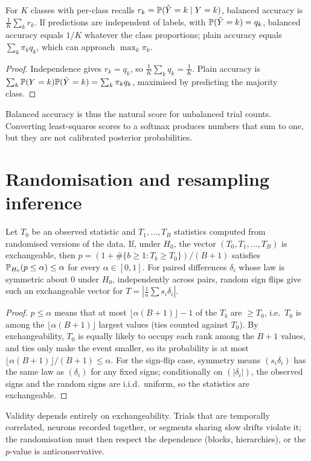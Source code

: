 \begin{theorem}\label{ars:dec-001}
For $K$ classes with per-class recalls $r_k=\mathbb P(\hat Y=k\mid Y=k)$, balanced accuracy is $\frac1K\sum_kr_k$. If predictions are independent of labels, with $\mathbb P(\hat Y=k)=q_k$, balanced accuracy equals $1/K$ whatever the class proportions; plain accuracy equals $\sum_k\pi_kq_k$, which can approach $\max_k\pi_k$.
\end{theorem}
\begin{proof}
Independence gives $r_k=q_k$, so $\frac1K\sum_kq_k=\frac1K$. Plain accuracy is $\sum_k\mathbb P(Y=k)\mathbb P(\hat Y=k)=\sum_k\pi_kq_k$, maximised by predicting the majority class.
\end{proof}
Balanced accuracy is thus the natural score for unbalanced trial counts. Converting least-squares scores to a softmax produces numbers that sum to one, but they are not calibrated posterior probabilities.

\section{Randomisation and resampling inference}
\begin{theorem}\label{ars:perm-001}
Let $T_0$ be an observed statistic and $T_1,\dots,T_B$ statistics computed from randomised versions of the data. If, under $H_0$, the vector $(T_0,T_1,\dots,T_B)$ is exchangeable, then $p=(1+\#\{b\ge1:T_b\ge T_0\})/(B+1)$ satisfies $\mathbb P_{H_0}(p\le\alpha)\le\alpha$ for every $\alpha\in[0,1]$. For paired differences $\delta_i$ whose law is symmetric about $0$ under $H_0$, independently across pairs, random sign flips give such an exchangeable vector for $T=|\frac1n\sum s_i\delta_i|$.
\end{theorem}
\begin{proof}
$p\le\alpha$ means that at most $\lfloor\alpha(B+1)\rfloor-1$ of the $T_b$ are $\ge T_0$, i.e.\ $T_0$ is among the $\lfloor\alpha(B+1)\rfloor$ largest values (ties counted against $T_0$). By exchangeability, $T_0$ is equally likely to occupy each rank among the $B+1$ values, and ties only make the event smaller, so its probability is at most $\lfloor\alpha(B+1)\rfloor/(B+1)\le\alpha$. For the sign-flip case, symmetry means $(s_i\delta_i)$ has the same law as $(\delta_i)$ for any fixed signs; conditionally on $(|\delta_i|)$, the observed signs and the random signs are i.i.d.\ uniform, so the statistics are exchangeable.
\end{proof}
Validity depends entirely on exchangeability. Trials that are temporally correlated, neurons recorded together, or segments sharing slow drifts violate it; the randomisation must then respect the dependence (blocks, hierarchies), or the $p$-value is anticonservative.

